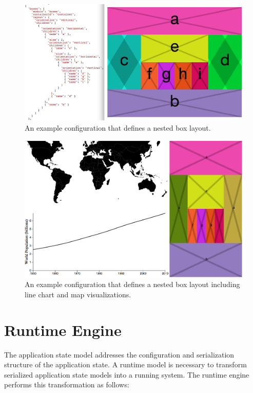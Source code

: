 \begin{figure}
  \centering
  \includegraphics[width=\figureWidth]{figs/boxes.png}
  \caption [Nested Box Layout Configuration]{An example configuration that defines a nested box layout. }
  \label{fig:dashboardLayout}
\end{figure}

\begin{figure}
  \centering
  \includegraphics[width=\figureWidth]{figs/prototype.png}
  \caption [Nested Boxes with Visualizations]{An example configuration that defines a nested box layout including line chart and map visualizations. }
  \label{fig:prototype}
\end{figure}

\section{Runtime Engine}
The application state model addresses the configuration and serialization structure of the application state. A runtime model is necessary to transform serialized application state models into a running system. The runtime engine performs this transformation as follows:

